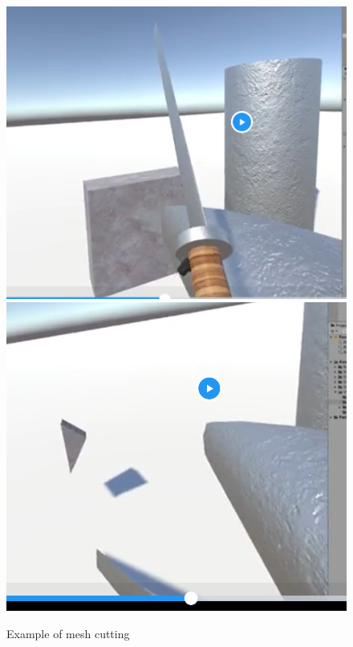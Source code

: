 \documentclass[10pt,twocolumn]{article}
\begin{document}
\begin{figure}[h]
\caption{Example of mesh cutting}
\centering
\includegraphics[scale=.2]{Screenshot_20221214_105111.png} \cite{meshCut2022}
\includegraphics[scale=.2]{Screenshot_20221214_105133.png} \cite{meshCut2022}
\end{figure}
\end{document}
